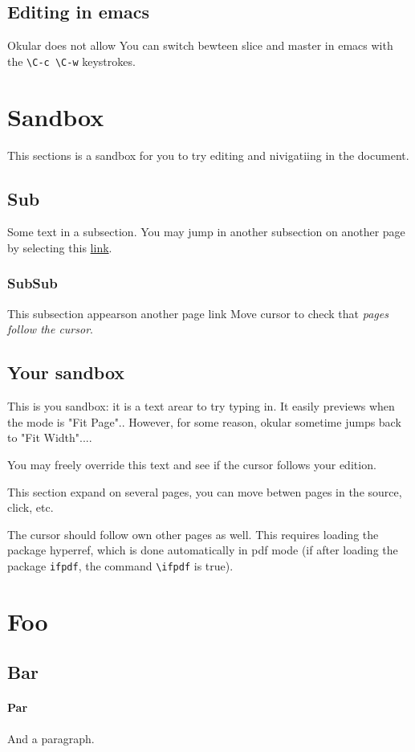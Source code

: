 \documentclass{article}
\begin{document}
\subsection{Editing in emacs}

Okular does not allow
You can switch bewteen slice and master in emacs with the 
\verb"\C-c \C-w" keystrokes. 


\section {Sandbox}

This sections is a sandbox for you to try editing and nivigatiing in the
document. 
 
\subsection {Sub}

Some text in a subsection.
You may jump in another subsection on another page by selecting this
\hyperlink{next}{link}.

\newpage

\subsubsection {SubSub} 

This subsection appearson another page \hypertarget{next}{link} 
Move cursor to check that \emph{pages follow the cursor}.

\subsection {Your sandbox}

 \hbox \bgroup

\begin{minipage}{0.8\linewidth}
This is you sandbox: it is a text arear to try typing in. It easily previews
when the mode is "Fit Page".. However, for some reason, okular sometime
jumps back to "Fit Width"....

\medskip

You may freely override this text and see if the cursor follows your
edition. 
\end{minipage}

\egroup
\centerline{}

\newpage
This section expand on several pages, you can move betwen pages in the
source, click, etc.



The cursor should follow own other pages as well.
This requires loading the package hyperref, which is done
automatically in pdf mode (if after loading the package \texttt{ifpdf}, 
the command \verb"\ifpdf" is true). 



\section{Foo}

\subsection {Bar}


\paragraph {Par}

And a paragraph.
\end{document}
